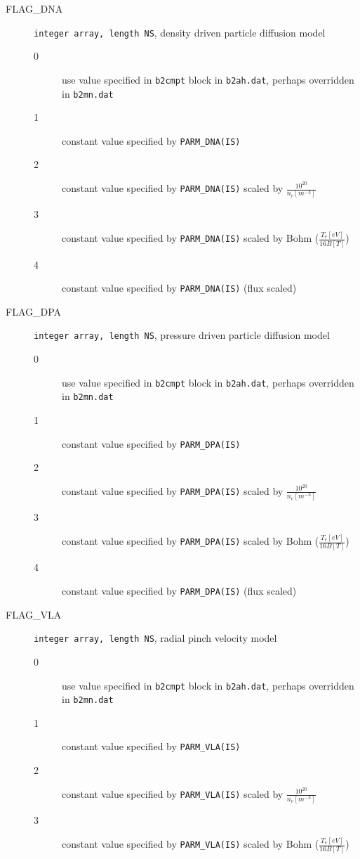 \documentclass[a4paper,10pt]{report}
\begin{document}
\begin{description}
\item[FLAG\_DNA] {\tt integer array, length NS}, density driven particle diffusion model
  \begin{description}
  \item[0] use value specified in {\tt b2cmpt} block in
  {\tt b2ah.dat}, perhaps overridden in {\tt b2mn.dat}
  \item[1] constant value specified by {\tt PARM\_DNA(IS)}
  \item[2] constant value specified by {\tt PARM\_DNA(IS)} scaled by
  $\frac{10^{20}}{n_e [m^{-3}]}$
  \item[3] constant value specified by {\tt PARM\_DNA(IS)} scaled by
  Bohm ($\frac{T_e [eV]}{16 B [T]}$)
  \item[4] constant value specified by {\tt PARM\_DNA(IS)} (flux scaled)
  \end{description}
\item[FLAG\_DPA] {\tt integer array, length NS}, pressure driven particle diffusion model
  \begin{description}
  \item[0] use value specified in {\tt b2cmpt} block in
  {\tt b2ah.dat}, perhaps overridden in {\tt b2mn.dat}
  \item[1] constant value specified by {\tt PARM\_DPA(IS)}
  \item[2] constant value specified by {\tt PARM\_DPA(IS)} scaled by
  $\frac{10^{20}}{n_e [m^{-3}]}$
  \item[3] constant value specified by {\tt PARM\_DPA(IS)} scaled by
  Bohm ($\frac{T_e [eV]}{16 B [T]}$)
  \item[4] constant value specified by {\tt PARM\_DPA(IS)} (flux scaled)
  \end{description}
\item[FLAG\_VLA] {\tt integer array, length NS}, radial pinch velocity model
  \begin{description}
  \item[0] use value specified in {\tt b2cmpt} block in
  {\tt b2ah.dat}, perhaps overridden in {\tt b2mn.dat}
  \item[1] constant value specified by {\tt PARM\_VLA(IS)}
  \item[2] constant value specified by {\tt PARM\_VLA(IS)} scaled by
  $\frac{10^{20}}{n_e [m^{-3}]}$
  \item[3] constant value specified by {\tt PARM\_VLA(IS)} scaled by
  Bohm ($\frac{T_e [eV]}{16 B [T]}$)

\end{description}
\end{description}
\end{document}
